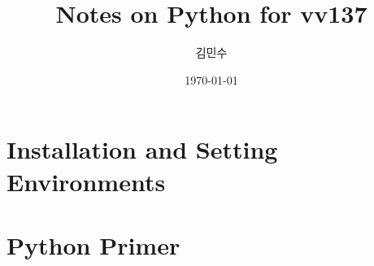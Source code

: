 \documentclass[
    ebook,
    12pt,
    oneside,
    openany,
    final
]{memoir}
\title{Notes on Python for vv137}
\author{김민수}
\date{\today}
\begin{document}
\frontmatter
\maketitle
\clearpage

\tableofcontents
\clearpage
\mainmatter

\part{Installation and Setting Environments}
%


\part{Python Primer}
%











\appendix

\backmatter
\end{document}
